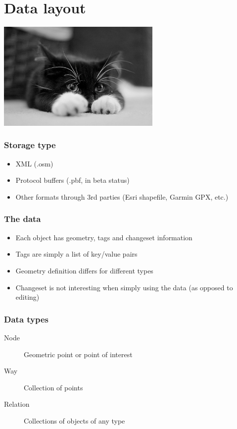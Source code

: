 \documentclass[14pt]{beamer}
\begin{document}
\section{Data layout}

\begin{frame}[fragile]
  \begin{center}
    \includegraphics[width=300px]{introduction.jpg}
  \end{center}
\end{frame}

\begin{frame}
  \frametitle{Storage type}
  \begin{itemize}
  \item XML (.osm)
  \item Protocol buffers (.pbf, in beta status)
  \item Other formats through 3rd parties
    (Esri shapefile, Garmin GPX, etc.)
  \end{itemize}
\end{frame}

\begin{frame}
  \frametitle{The data}
  \begin{itemize}
  \item Each object has geometry, tags and changeset information
  \item Tags are simply a list of key/value pairs
  \item Geometry definition differs for different types
  \item Changeset is not interesting when simply using the
    data (as opposed to editing)
  \end{itemize}
\end{frame}

\begin{frame}
  \frametitle{Data types}
  \begin{description}
  \item[Node] Geometric point or point of interest
  \item[Way] Collection of points
  \item[Relation] Collections of objects of any type
  \end{description}
\end{frame}
\end{document}
